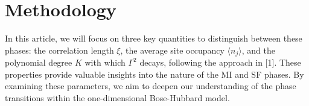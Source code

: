\section{Methodology}


In this article, we will focus on three key quantities to distinguish between these phases: the correlation length $\xi$, the average site occupancy $\langle n_j \rangle$, and the polynomial degree \( K \) with which \(\Gamma^2\) decays, following the approach in [1]. These properties provide valuable insights into the nature of the MI and SF phases. By examining these parameters, we aim to deepen our understanding of the phase transitions within the one-dimensional Bose-Hubbard model.




